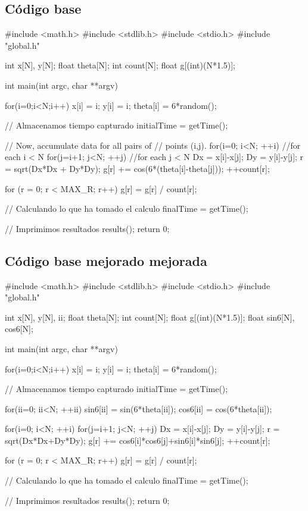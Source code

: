 \scriptsize
\subsection{C\'odigo base}
\begin{verbatimtab}
#include <math.h>
#include <stdlib.h>
#include <stdio.h>
#include "global.h"

int x[N], y[N];
float theta[N];
int count[N];
float g[(int)(N*1.5)];

int main(int argc, char **argv)
{
	for(i=0;i<N;i++)
	{
		x[i] = i;
		y[i] = i;
		theta[i] = 6*random();
	}

	//	Almacenamos tiempo capturado
	initialTime = getTime();

	//	Now, accumulate data for all pairs of
	//	points (i,j).
	for(i=0; i<N; ++i)	//for each i < N
		for(j=i+1; j<N; ++j)	//for each j < N
		{
			Dx = x[i]-x[j];
			Dy = y[i]-y[j];
			r = sqrt(Dx*Dx + Dy*Dy);
			g[r] += cos(6*(theta[i]-theta[j]));
			++count[r];
		}

	for (r = 0; r < MAX_R; r++)
		g[r] = g[r] / count[r];

	//	Calculando lo que ha tomado el calculo
	finalTime = getTime();

	//	Imprimimos resultados
	results();
	return 0;

}
\end{verbatimtab}


\subsection{C\'odigo base mejorado mejorada}
\begin{verbatimtab}
#include <math.h>
#include <stdlib.h>
#include <stdio.h>
#include "global.h"

int x[N], y[N], ii;
float theta[N];
int count[N];
float g[(int)(N*1.5)];
float sin6[N], cos6[N];

int main(int argc, char **argv)
{
	for(i=0;i<N;i++)
	{
		x[i] = i;
		y[i] = i;
		theta[i] = 6*random();
	}

	//	Almacenamos tiempo capturado
	initialTime = getTime();

	for(ii=0; ii<N; ++ii)
	{ 	
		sin6[ii] = sin(6*theta[ii]);
		cos6[ii] = cos(6*theta[ii]);
	}
	
	for(i=0; i<N; ++i)
		for(j=i+1; j<N; ++j)
		{
		Dx = x[i]-x[j];
		Dy = y[i]-y[j];
		r = sqrt(Dx*Dx+Dy*Dy);
		g[r] += cos6[i]*cos6[j]+sin6[i]*sin6[j];
		++count[r];
		}
	
	for (r = 0; r < MAX_R; r++)
		g[r] = g[r] / count[r];

	//	Calculando lo que ha tomado el calculo
	finalTime = getTime();

	//	Imprimimos resultados
	results();
	return 0;

}
\end{verbatimtab}

